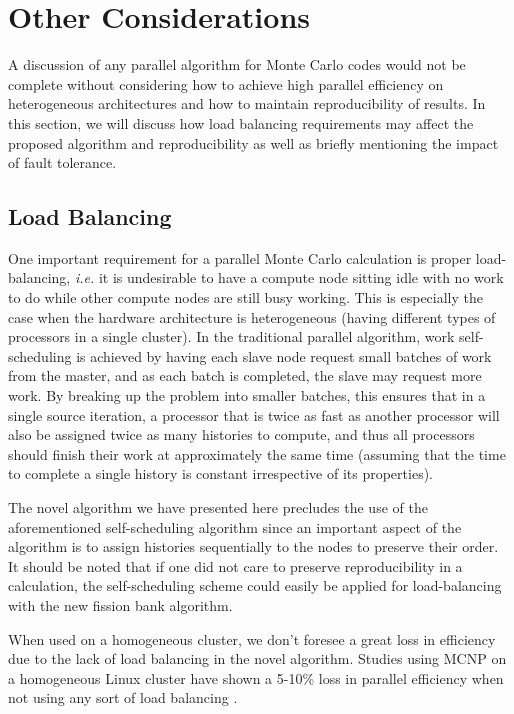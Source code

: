 \documentclass[11pt]{article}
\begin{document}
\section{Other Considerations}
\label{sec:other}

A discussion of any parallel algorithm for Monte Carlo codes would not
be complete without considering how to achieve high parallel
efficiency on heterogeneous architectures and how to maintain
reproducibility of results. In this section, we will discuss how load
balancing requirements may affect the proposed algorithm and
reproducibility as well as briefly mentioning the impact of fault
tolerance.

\subsection{Load Balancing}
\label{load-balancing}

One important requirement for a parallel Monte Carlo calculation is
proper load-balancing, {\em i.e.} it is undesirable to have a compute
node sitting idle with no work to do while other compute nodes are
still busy working. This is especially the case when the hardware
architecture is heterogeneous (having different types of processors in
a single cluster). In the traditional parallel algorithm, work
self-scheduling is achieved by having each slave node request small
batches of work from the master, and as each batch is completed, the
slave may request more work. By breaking up the problem into smaller
batches, this ensures that in a single source iteration, a processor
that is twice as fast as another processor will also be assigned twice
as many histories to compute, and thus all processors should finish
their work at approximately the same time (assuming that the time to
complete a single history is constant irrespective of its properties).

The novel algorithm we have presented here precludes the use of the
aforementioned self-scheduling algorithm since an important aspect of
the algorithm is to assign histories sequentially to the nodes to
preserve their order. It should be noted that if one did not care to
preserve reproducibility in a calculation, the self-scheduling scheme
could easily be applied for load-balancing with the new fission bank
algorithm.

When used on a homogeneous cluster, we don't foresee a great loss in
efficiency due to the lack of load balancing in the novel
algorithm. Studies using MCNP on a homogeneous Linux cluster have
shown a 5-10\% loss in parallel efficiency when not using any sort of
load balancing \cite{brown-lectures}.
\end{document}
